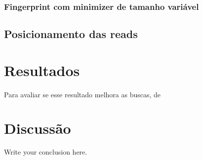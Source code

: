 \documentclass{article}
\begin{document}
\subsubsection{Fingerprint com minimizer de tamanho variável}
\subsection{Posicionamento das reads}
\section{Resultados}
\paragraph{}{Para avaliar se esse resultado melhora as buscas, de}
\section{Discussão}
Write your conclusion here.
\end{document}

